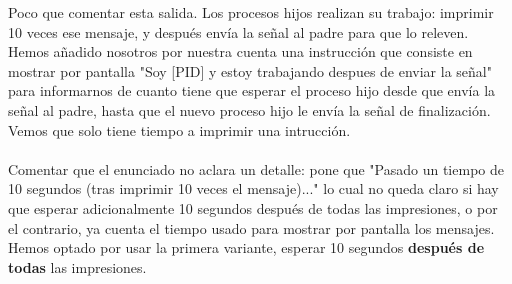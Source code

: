 \documentclass[12pt]{article}
\begin{document}
Poco que comentar esta salida. Los procesos hijos realizan su trabajo: imprimir 10 veces ese mensaje, y después envía la señal al padre para que lo releven. \\ Hemos añadido nosotros por nuestra cuenta una instrucción que consiste en mostrar por pantalla "Soy [PID] y estoy trabajando despues de enviar la señal" para informarnos de cuanto tiene que esperar el proceso hijo desde que envía la señal al padre, hasta que el nuevo proceso hijo le envía la señal de finalización. Vemos que solo tiene tiempo a imprimir una intrucción.\\\\
Comentar que el enunciado no aclara un detalle: pone que "Pasado un tiempo de 10 segundos (tras imprimir 10 veces el mensaje)..." lo cual no queda claro si hay que esperar adicionalmente 10 segundos después de todas las impresiones, o por el contrario, ya cuenta el tiempo usado para mostrar por pantalla los mensajes.\\ Hemos optado por usar la primera variante, esperar 10 segundos \textbf{después de todas} las impresiones. 
\end{document}
